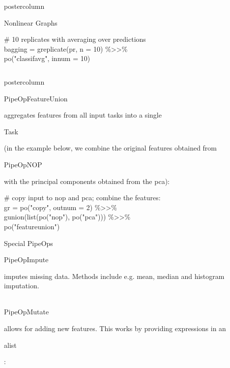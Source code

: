 \documentclass{beamer}
\newlength{\columnheight} %
\newcommand{\codeinline}[1]{\begin{codeboxinline}#1\end{codeboxinline}}
\begin{document}
\begin{frame}[fragile]{}
\begin{columns}
\begin{column}{.245\textwidth}
\begin{beamercolorbox}[center]{postercolumn}
\begin{minipage}{.98\textwidth}
{\begin{myblock}{Nonlinear Graphs}
\begin{codeboxexample}
{                  \# 10 replicates with averaging over predictions\\
                  bagging = greplicate(pr, n = 10) \%>{}>\%\\
                  \hspace*{1ex} po("classifavg", innum = 10)}
					    \end{codeboxexample}
            \end{myblock}
            \vfill}
         \end{minipage}
	    \end{beamercolorbox}
		\end{column}
 \end{columns}
\end{frame}
\begin{frame}[fragile]{}
	\begin{columns}
		\begin{column}{.245\textwidth}
			\begin{beamercolorbox}[center]{postercolumn}
				\begin{minipage}{.98\textwidth}
					\parbox[t][\columnheight]{\textwidth}{
            \codeinline{PipeOpFeatureUnion} aggregates features from all input tasks into a single \codeinline{Task} (in the example below, we combine the original features obtained from \codeinline{PipeOpNOP} with the principal components obtained from the pca):
              \begin{codeboxexample}
						    {\footnotesize
                  \# copy input to nop and pca; combine the features:\\
                  gr = po("copy", outnum = 2) \%>{}>\%\\
                  \hspace*{1ex} gunion(list(po("nop"), po("pca"))) \%>{}>\%\\
                  \hspace*{1ex} po("featureunion")}
              \end{codeboxexample}
              \begin{myblock}{Special PipeOps}
                \codeinline{PipeOpImpute} imputes missing data. Methods include e.g. mean, median and histogram imputation.\\
                \ \\
                \codeinline{PipeOpMutate} allows for adding new features. This works by providing expressions in an \codeinline{alist}:
                \begin{codeboxexample}
                  \footnotesize{
}
\end{codeboxexample}
\end{myblock}}
\end{minipage}
\end{beamercolorbox}
\end{column}
\end{columns}
\end{frame}
\end{document}
